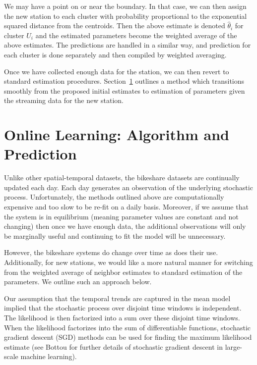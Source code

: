 \documentclass{acm_proc_article-sp}
\begin{document}
We may have a point on or near the boundary.  In that case, we can then assign the new station to each cluster with probability proportional to the exponential squared distance from the centroids.  Then the above estimate is denoted $\hat{\theta}_i$ for cluster $U_i$ and the estimated parameters become the weighted average of the above estimates.  The predictions are handled in a similar way, and prediction for each cluster is done separately and then compiled by weighted averaging.

Once we have collected enough data for the station, we can then revert to standard estimation procedures.  Section~\ref{online_learning}  outlines a method which transitions smoothly from the proposed initial estimates to estimation of parameters given the streaming data for the new station.

\section{Online Learning: Algorithm and Prediction} \label{online_learning}

Unlike other spatial-temporal datasets, the bikeshare datasets are continually updated each day.  Each day generates an observation of the underlying stochastic process. Unfortunately, the methods outlined above are computationally expensive and too slow to be re-fit on a daily basis.  Moreover, if we assume that the system is in equilibrium (meaning parameter values are constant and not changing) then once we have enough data, the additional observations will only be marginally useful and continuing to fit the model will be unnecessary.

However, the bikeshare systems do change over time as does their use.  Additionally, for new stations, we would like a more natural manner for switching from the weighted average of neighbor estimates to standard estimation of the parameters.  We outline such an approach below.

Our assumption that the temporal trends are captured in the mean model implied that the stochastic process over disjoint time windows is independent.  The likelihood is then factorized into a sum over these disjoint time windows.  When the likelihood factorizes into the sum of differentiable functions, stochastic gradient descent (SGD) methods can be used for finding the maximum likelihood estimate (see Bottou \cite{bottou:sgd} for further details of stochastic gradient descent in large-scale machine learning).
\end{document}
